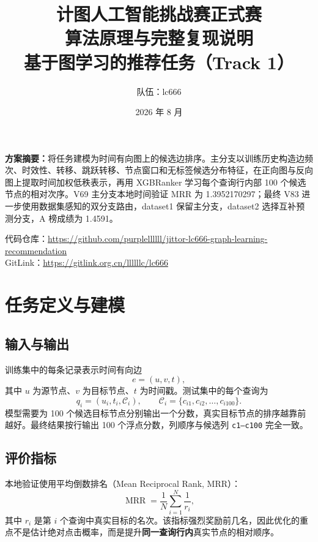 \documentclass[UTF8,a4paper,11pt]{ctexart}
\title{\vspace{-1.3cm}\textbf{计图人工智能挑战赛正式赛\\算法原理与完整复现说明}\\[0.7em]
\large 基于图学习的推荐任务（Track 1）}
\author{队伍：lc666}
\date{2026 年 8 月}
\begin{document}
\maketitle
\thispagestyle{empty}
\vfill
\begin{center}
\begin{minipage}{0.88\textwidth}
\colorbox{softblue}{%
  \parbox{0.94\textwidth}{
    \textbf{方案摘要：}将任务建模为时间有向图上的候选边排序。主分支以训练历史构造边频次、时效性、转移、跳跃转移、节点窗口和无标签候选分布特征，在正向图与反向图上提取时间加权低秩表示，再用 XGBRanker 学习每个查询行内部 100 个候选节点的相对次序。V69 主分支本地时间验证 MRR 为 1.3952170297；最终 V83 进一步使用数据集感知的双分支路由，dataset1 保留主分支，dataset2 选择互补预测分支，A 榜成绩为 1.4591。
  }}
\end{minipage}
\end{center}
\vfill
\begin{center}
\small
代码仓库：\url{https://github.com/purplellllll/jittor-lc666-graph-learning-recommendation}\\
GitLink：\url{https://gitlink.org.cn/llllllc/lc666}
\end{center}
\clearpage

\tableofcontents
\clearpage

\section{任务定义与建模}

\subsection{输入与输出}

训练集中的每条记录表示时间有向边
\[
e=(u,v,t),
\]
其中 $u$ 为源节点、$v$ 为目标节点、$t$ 为时间戳。测试集中的每个查询为
\[
q_i=(u_i,t_i,\mathcal{C}_i),\qquad
\mathcal{C}_i=\{c_{i1},c_{i2},\ldots,c_{i100}\}.
\]
模型需要为 100 个候选目标节点分别输出一个分数，真实目标节点的排序越靠前越好。最终结果按行输出 100 个浮点分数，列顺序与候选列 \texttt{c1--c100} 完全一致。

\subsection{评价指标}

本地验证使用平均倒数排名（Mean Reciprocal Rank, MRR）：
\[
\operatorname{MRR}=\frac{1}{N}\sum_{i=1}^{N}\frac{1}{r_i},
\]
其中 $r_i$ 是第 $i$ 个查询中真实目标的名次。该指标强烈奖励前几名，因此优化的重点不是估计绝对点击概率，而是提升\textbf{同一查询行内}真实节点的相对顺序。
\end{document}
